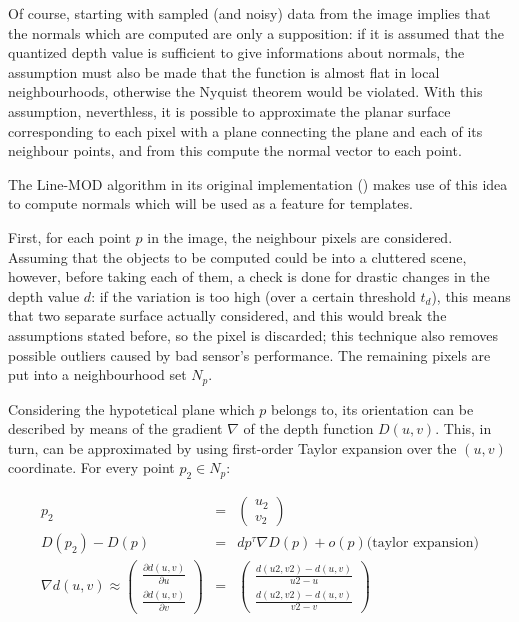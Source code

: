 Of course, starting with sampled (and noisy) data from the image
implies that the normals which are computed are only a supposition:
if it is assumed that the quantized depth value is sufficient to give
informations about normals, the assumption must also be made that the
function is almost flat in local neighbourhoods, otherwise the Nyquist
theorem would be violated. With this assumption, neverthless, it is
possible to approximate the planar surface corresponding to each pixel
with a plane connecting the plane and each of its neighbour points,
and from this compute the normal vector to each point.

The Line-MOD algorithm in its original implementation
(\cite{linemod-paper}) makes use of this idea to compute normals which will be used
as a feature for templates.

First, for each point $p$ in the image, the neighbour pixels are
considered. Assuming that the objects to be computed could be into a
cluttered scene, however, before taking each of them, a check is done
for drastic changes in the depth value $d$: if the variation is too
high (over a certain threshold $t_d$), this means that two separate
surface actually considered, and this would break the assumptions
stated before, so the pixel is discarded; this technique also removes
possible outliers caused by bad sensor's performance.  The remaining pixels are put
into a neighbourhood set $N_p$. 

Considering the hypotetical plane which $p$ belongs to, its
orientation can be described by means of the gradient $\nabla$ of the
depth function $D(u,v)$. This, in turn, can be approximated by using first-order
Taylor expansion over the $(u,v)$ coordinate. For every point $p_2 \in N_p$:

\begin{eqnarray}
  p_2 & = & \begin{pmatrix} u_2 \\ v_2 
  \end{pmatrix} \\
  D(p_2)-D(p) & = & dp^{\tau}\nabla D (p) + o (p) \text{(taylor
    expansion)} \label{eqn:taylor-depth-expansion}\\
  \nabla d(u,v) \approx \begin{pmatrix} \frac{\partial d(u,v)}{\partial u}
    \\ \frac{\partial d(u,v)}{\partial v}
  \end{pmatrix} & = & \begin{pmatrix} \frac{d(u2,v2)-d(u,v)}{u2-u} \\
    \frac{d(u2,v2)-d(u,v)}{v2-v} 
  \end{pmatrix}
\end{eqnarray}

